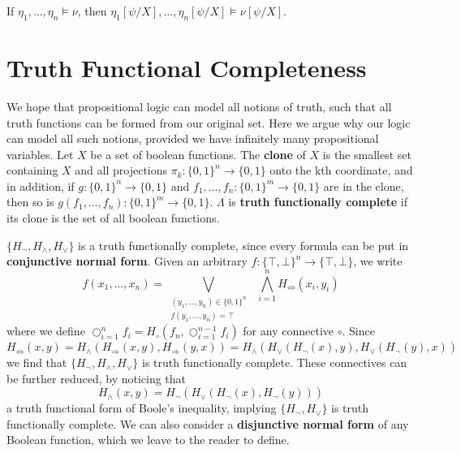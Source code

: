 \begin{corollary}
    If $\eta_1, \dots, \eta_n \vDash \nu$, then $\eta_1[\psi/X], \dots, \eta_n[\psi/X] \vDash \nu[\psi/X]$.
\end{corollary}

\section{Truth Functional Completeness}

We hope that propositional logic can model all notions of truth, such that all truth functions can be formed from our original set. Here we argue why our logic can model all such notions, provided we have infinitely many propositional variables. Let $X$ be a set of boolean functions. The {\bf clone} of $X$ is the smallest set containing $X$ and all projections $\pi_k : \{ 0, 1 \}^n \to \{ 0, 1 \}$ onto the kth coordinate, and in addition, if $g: \{ 0, 1 \}^n \to \{ 0, 1 \}$ and $f_1, \dots, f_n : \{ 0, 1 \}^m \to \{ 0, 1 \}$ are in the clone, then so is $g(f_1, \dots, f_n): \{ 0, 1 \}^m \to \{ 0, 1 \}$. $\Lambda$ is {\bf truth functionally complete} if its clone is the set of all boolean functions.

\begin{example}
    $\{ H_\neg, H_\wedge, H_\vee \}$ is a truth functionally complete, since every formula can be put in {\bf conjunctive normal form}. Given an arbitrary $f: \{ \top, \bot \}^n \to \{ \top, \bot \}$, we write
    \[ f(x_1, \dots, x_n) = \bigvee_{\substack{(y_1, \dots, y_n) \in \{ 0, 1 \}^n\\f(y_1, \dots, y_n) = \top}}\ \  \bigwedge_{i = 1}^n H_\Leftrightarrow(x_i, y_i) \]
    where we define $\bigcirc_{i = 1}^n f_i = H_\circ(f_n, \bigcirc_{i = 1}^{n-1} f_i)$ for any connective $\circ$. Since
    \[ H_\Leftrightarrow(x,y) = H_\wedge(H_\Rightarrow(x,y), H_\Rightarrow(y,x)) = H_\wedge(H_\vee(H_\neg(x), y), H_\vee(H_\neg(y), x)) \]
    we find that $\{ H_\neg, H_\wedge, H_\vee \}$ is truth functionally complete. These connectives can be further reduced, by noticing that
    \[ H_\wedge(x,y) = H_\neg(H_\vee(H_\neg(x), H_\neg(y))) \]
    a truth functional form of Boole's inequality, implying $\{ H_\neg, H_\vee \}$ is truth functionally complete. We can also consider a {\bf disjunctive normal form} of any Boolean function, which we leave to the reader to define.
\end{example}

